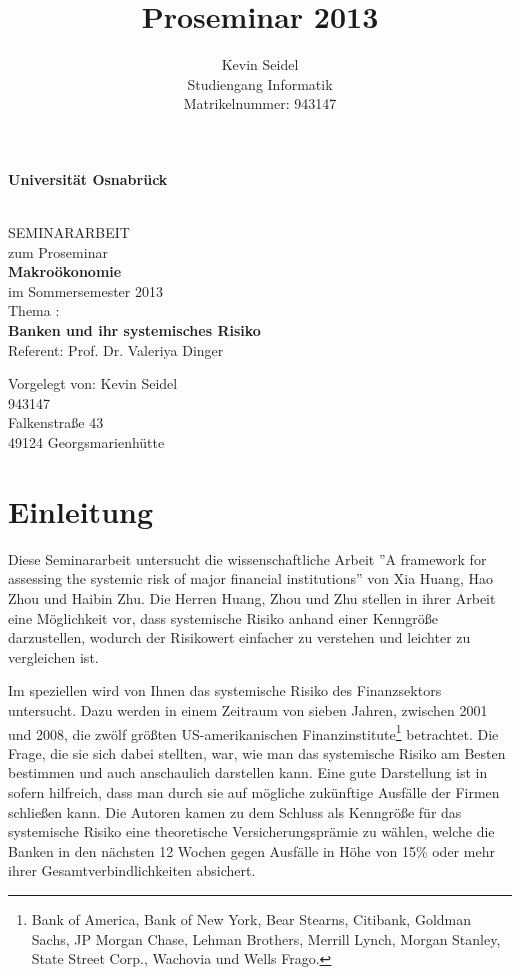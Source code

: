 \documentclass[a4paper,12pt]{scrartcl}
\title{Proseminar 2013}
\author{Kevin Seidel \\ Studiengang Informatik \\ Matrikelnummer: 943147}
\begin{document}
\begin{titlepage}
\begin{center}
\vspace*{1.5cm}
\begin{Large}
\textbf{Universität Osnabrück} \\[1cm]
\end{Large}

\noindent\hrulefill
\\[1.5cm]
SEMINARARBEIT \\[1cm]
zum Proseminar \\[1cm]
\textbf{Makroökonomie} \\[1cm]
im Sommersemester 2013 \\[1.5cm]
Thema : \\[1cm]
\textbf{Banken und ihr systemisches Risiko} \\[1cm]
Referent: Prof. Dr. Valeriya Dinger \\[2cm]

\end{center}
\begin{flushleft}
Vorgelegt von: \hfill Kevin Seidel \\
\hfill 943147 \\
\hfill Falkenstraße 43 \\
\hfill 49124 Georgsmarienhütte
\end{flushleft}

\end{titlepage}

\newpage

\setcounter{page}{2}
\tableofcontents



\newpage
{} 
\setcounter{page}{1} 
\section{Einleitung}
Diese Seminararbeit untersucht die wissenschaftliche Arbeit ''A framework for assessing the systemic risk of major financial institutions'' von  Xia Huang, Hao Zhou und Haibin Zhu. 
Die Herren Huang, Zhou und Zhu stellen in ihrer Arbeit eine Möglichkeit vor, dass systemische Risiko anhand einer Kenngröße darzustellen, wodurch der Risikowert einfacher zu verstehen und leichter zu vergleichen ist.

Im speziellen wird von Ihnen das systemische Risiko des Finanzsektors untersucht. Dazu werden in einem Zeitraum von sieben Jahren, zwischen 2001 und 2008, die zwölf größten US-amerikanischen Finanzinstitute\footnote{Bank of America, Bank of New York, Bear Stearns, Citibank, Goldman Sachs, JP Morgan Chase, Lehman Brothers, Merrill Lynch, Morgan Stanley, State Street Corp., Wachovia und Wells Frago.} betrachtet. 
Die Frage, die sie sich dabei stellten, war, wie man das systemische Risiko am Besten bestimmen und auch anschaulich darstellen kann. Eine gute Darstellung ist in sofern hilfreich, dass man durch sie auf mögliche zukünftige Ausfälle der Firmen schließen kann.
Die Autoren kamen zu dem Schluss als Kenngröße für das systemische Risiko eine theoretische Versicherungsprämie zu wählen, welche die Banken in den nächsten 12 Wochen gegen Ausfälle in Höhe von 15\% oder mehr ihrer Gesamtverbindlichkeiten absichert. 
\end{document}
